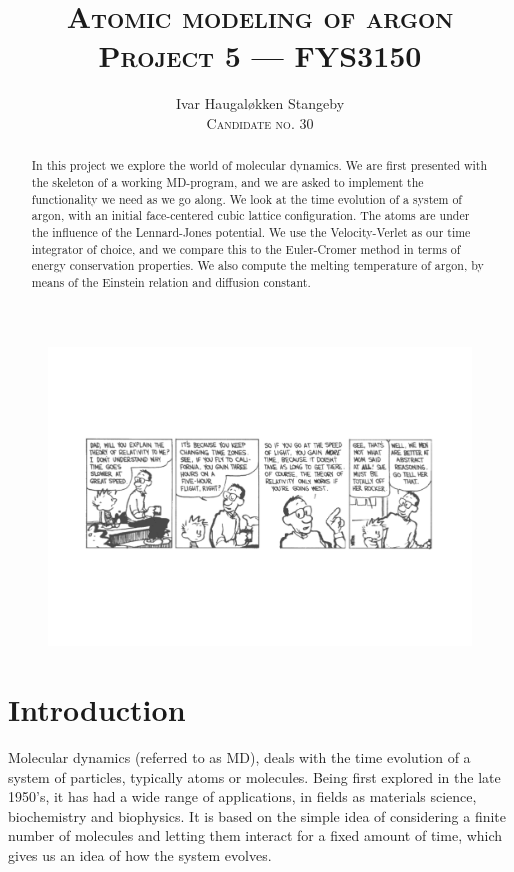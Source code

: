 \documentclass[a4paper]{article}
\title{%
    \textsc{Atomic modeling of argon}\\
    \footnotesize{\textsc{Project 5 --- FYS3150}}
}
\author{%
    Ivar Haugal{\o}kken Stangeby\\
    \footnotesize{\textsc{Candidate no. 30}}
}
\begin{document}
\maketitle    

\begin{figure}[h]
    \centering
    \includegraphics[width=\linewidth]{ch.pdf}
\end{figure}

\begin{abstract}
    In this project we explore the world of molecular dynamics. We are first
    presented with the skeleton of a working MD-program, and we are asked to
    implement the functionality we need as we go along. We look at the time
    evolution of a system of argon, with an initial face-centered cubic lattice
    configuration. The atoms are under the influence of the Lennard-Jones
    potential. We use the Velocity-Verlet as our time integrator of choice, and
    we compare this to the Euler-Cromer method in terms of energy conservation
    properties. We also compute the melting temperature of argon, by means of
    the Einstein relation and diffusion constant.
\end{abstract}
\tableofcontents
\listoffigures      

\section{Introduction}
\label{sec:introduction}
    Molecular dynamics (referred to as MD), deals with the time evolution of a
    system of particles, typically atoms or molecules. Being first explored in
    the late 1950's, it has had a wide range of applications, in fields as
    materials science, biochemistry and biophysics. It is based on the simple
    idea of considering a finite number of molecules and letting them interact
    for a fixed amount of time, which gives us an idea of how the system
    evolves. 
\end{document}

